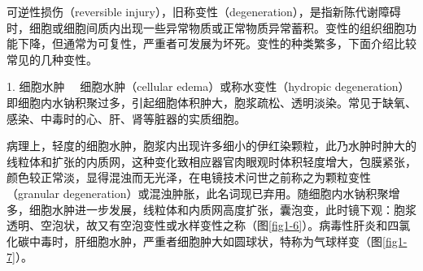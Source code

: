 可逆性损伤（reversible
injury），旧称变性（degeneration），是指新陈代谢障碍时，细胞或细胞间质内出现一些异常物质或正常物质异常蓄积。变性的组织细胞功能下降，但通常为可复性，严重者可发展为坏死。变性的种类繁多，下面介绍比较常见的几种变性。

{1. 细胞水肿} 　细胞水肿（cellular edema）或称水变性（hydropic
degeneration）即细胞内水钠积聚过多，引起细胞体积肿大，胞浆疏松、透明淡染。常见于缺氧、感染、中毒时的心、肝、肾等脏器的实质细胞。

病理上，轻度的细胞水肿，胞浆内出现许多细小的伊红染颗粒，此乃水肿时肿大的线粒体和扩张的内质网，这种变化致相应器官肉眼观时体积轻度增大，包膜紧张，颜色较正常淡，显得混浊而无光泽，在电镜技术问世之前称之为颗粒变性（granular
degeneration）或混浊肿胀，此名词现已弃用。随细胞内水钠积聚增多，细胞水肿进一步发展，线粒体和内质网高度扩张，囊泡变，此时镜下观：胞浆透明、空泡状，故又有空泡变性或水样变性之称（图\ref{fig1-6}）。病毒性肝炎和四氯化碳中毒时，肝细胞水肿，严重者细胞肿大如圆球状，特称为气球样变（图\ref{fig1-7}）。
